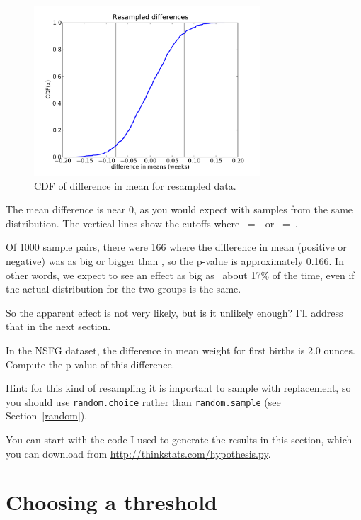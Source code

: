 \documentclass[12pt]{book}
\begin{document}
\begin{figure}
\centerline{\includegraphics[height=2.5in]{figs/length_deltas_cdf.pdf}}
\caption{CDF of difference in mean for resampled data.}
\label{length_deltas_cdf}
\end{figure}

The mean difference is near 0, as you would expect with samples
from the same distribution.  The vertical lines show the cutoffs where
\x~=~\minus\mydelta~or \x~=~\mydelta.

Of 1000 sample pairs, there were 166 where the difference in mean
(positive or negative) was as big or bigger than \mydelta, so the
p-value is approximately 0.166.  In other words, we expect to see an
effect as big as \mydelta~about 17\% of the time, even if the actual
distribution for the two groups is the same.

So the apparent effect is not very likely, but is it unlikely enough?
I'll address that in the next section.

\begin{exercise}
In the NSFG dataset, the difference in mean weight for first
births is 2.0 ounces.  Compute the p-value of this difference.

Hint: for this kind of resampling it is important to sample
with replacement, so you should use {\tt random.choice} rather
than {\tt random.sample} (see Section~\ref{random}).

You can start with the code I used to generate the results in this
section, which you can download from \url{http://thinkstats.com/hypothesis.py}.

\end{exercise}


\section{Choosing a threshold}
\label{threshold}
\end{document}
